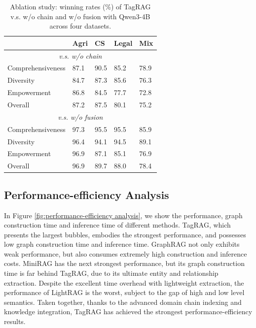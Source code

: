 \documentclass[11pt]{article}
\begin{document}
\begin{table}[h]
\centering
\small
\begin{tabularx}{0.48\textwidth}{lXXXX}
\toprule
& Agri& CS& Legal& Mix\\ \midrule
\multicolumn{5}{c}{\textit{v.s. w/o chain}}\\   \midrule
Comprehensiveness & 87.1& 90.5& 85.2& 78.9\\
Diversity & 84.7& 87.3& 85.6& 76.3\\
Empowerment & 86.8& 84.5& 77.7& 72.8\\
Overall & 87.2& 87.5& 80.1& 75.2\\  \midrule

\multicolumn{5}{c}{\textit{v.s. w/o fusion}}\\   \midrule
Comprehensiveness & 97.3& 95.5& 95.5& 85.9\\
Diversity & 96.4& 94.1& 94.5& 89.1\\
Empowerment & 96.9& 87.1& 85.1& 76.9\\
Overall & 96.9& 89.7& 88.0& 78.4\\
\bottomrule
\end{tabularx}
\caption{Ablation study: winning rates (\%) of TagRAG v.s. w/o chain and w/o fusion with Qwen3-4B across four datasets.}
\label{tab:ablation study}
\end{table}


\subsection{Performance-efficiency Analysis}
In Figure \ref{fig:performance-efficiency analysis}, we show the performance, graph construction time and inference time of different methods. TagRAG, which presents the largest bubbles, embodies the strongest performance, and possesses low graph construction time and inference time.
GraphRAG not only exhibits weak performance, but also consumes extremely high construction and inference costs.
MiniRAG has the next strongest performance, but its graph construction time is far behind TagRAG, due to its ultimate entity and relationship extraction.
Despite the excellent time overhead with lightweight extraction, the performance of LightRAG is the worst, subject to the gap of high and low level semantics.
Taken together, thanks to the advanced domain chain indexing and knowledge integration, TagRAG has achieved the strongest performance-efficiency results.
\end{document}
